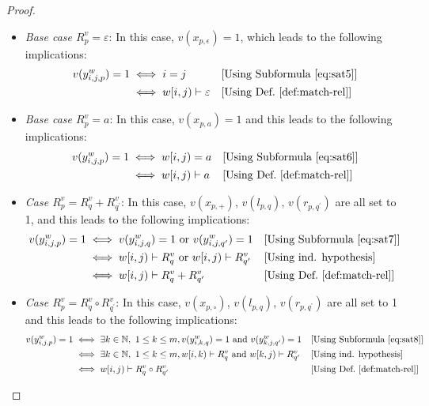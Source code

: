 \begin{proof}
\begin{itemize}[label=$-$]
    \item \textit{Base case $R^v_p=\varepsilon$}: In this case, $v(x_{p,\epsilon})=1$, which leads to the following implications:
    \begin{align*}
    v(y^w_{i,j,p})=1&\iff i=j  &&\text{[Using Subformula~\eqref{eq:sat5}]}\\
                    &\iff w[i,j)\vdash\varepsilon &&\text{[Using Def.~\ref{def:match-rel}]}
    \end{align*}
    \item \textit{Base case $R^v_p=a$}: In this case, $v(x_{p,a})=1$ and this leads to the following implications: 
    \begin{align*}
    v(y^w_{i,j,p})=1 &\iff w[i,j)=a &&\text{[Using Subformula~\eqref{eq:sat6}]}\\
                     &\iff w[i,j)\vdash a&&\text{[Using Def.~\ref{def:match-rel}]}
    \end{align*}
    \item \textit{Case $R^v_p=R^v_q+R^v_{q^{\prime}}$}: In this case, $v(x_{p,+})$, $v(l_{p,q})$, $v(r_{p,q^{\prime}})$ are all set to 1, and this leads to the following implications:
    \begin{align*}
    v(y^w_{i,j,p})=1 &\iff v(y^w_{i,j,q})=1 \text{ or } v(y^w_{i,j,q^{\prime}})=1 &&\text{[Using Subformula~\eqref{eq:sat7}]}\\
    &\iff w[i,j)\vdash R^v_q\text{ or } w[i,j)\vdash R^v_{q^{\prime}}&&\text{[Using ind. hypothesis]}\\
    &\iff w[i,j)\vdash R^v_q+R^v_{q^{\prime}}&&\text{[Using Def.~\ref{def:match-rel}]}
    \end{align*}
    \item \textit{Case $R^v_p=R^v_q\circ R^v_{q^{\prime}}$}: In this case, $v(x_{p,\circ})$, $v(l_{p,q})$, $v(r_{p,q^{\prime}})$ are all set to 1 and this leads to the following implications:
    \begin{align*}
    v(y^w_{i,j,p})=1 &\iff \exists k\in \mathbb{N},\ 1\leq k\leq m, v(y^w_{i,k,q})=1 \text{ and } v(y^w_{k,j,q^{\prime}})=1 &&\text{[Using Subformula~\eqref{eq:sat8}]}\\
    &\iff \exists k\in \mathbb{N},\ 1\leq k\leq m, w[i,k)\vdash R^v_q \text{ and } w[k,j)\vdash R^v_{q^{\prime}}&&\text{[Using ind. hypothesis]}\\
    &\iff w[i,j)\vdash R^v_q\circ R^v_{q^{\prime}}&&\text{[Using Def.~\ref{def:match-rel}]}
    \end{align*}

\end{itemize}
\end{proof}

